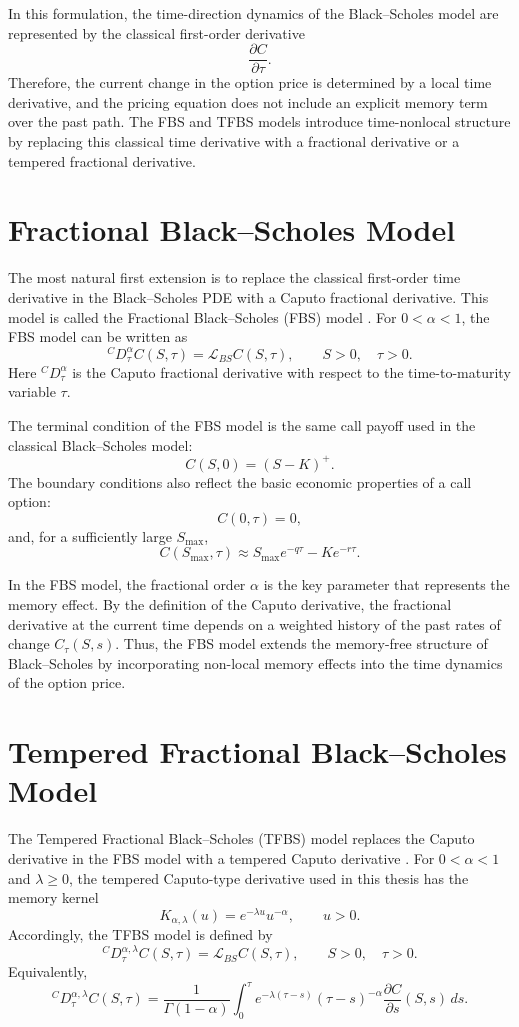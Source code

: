 \documentclass[11pt,a4paper]{report}
\begin{document}
In this formulation, the time-direction dynamics of the Black--Scholes model are represented by the classical first-order derivative
\[
\frac{\partial C}{\partial \tau}.
\]
Therefore, the current change in the option price is determined by a local time derivative, and the pricing equation does not include an explicit memory term over the past path. The FBS and TFBS models introduce time-nonlocal structure by replacing this classical time derivative with a fractional derivative or a tempered fractional derivative.

\section{Fractional Black--Scholes Model}

The most natural first extension is to replace the classical first-order time derivative in the Black--Scholes PDE with a Caputo fractional derivative. This model is called the Fractional Black--Scholes (FBS) model \cite{Wyss2000,Magdziarz2009}. For $0<\alpha<1$, the FBS model can be written as
\[
{}^C D_\tau^\alpha C(S,\tau)
=
\mathcal{L}_{BS}C(S,\tau),
\qquad S>0,
\quad \tau>0.
\]
Here ${}^C D_\tau^\alpha$ is the Caputo fractional derivative with respect to the time-to-maturity variable $\tau$.

The terminal condition of the FBS model is the same call payoff used in the classical Black--Scholes model:
\[
C(S,0)
=
(S-K)^+.
\]
The boundary conditions also reflect the basic economic properties of a call option:
\[
C(0,\tau)=0,
\]
and, for a sufficiently large $S_{\max}$,
\[
C(S_{\max},\tau)
\approx
S_{\max}e^{-q\tau}
-
Ke^{-r\tau}.
\]

In the FBS model, the fractional order $\alpha$ is the key parameter that represents the memory effect. By the definition of the Caputo derivative, the fractional derivative at the current time depends on a weighted history of the past rates of change $C_\tau(S,s)$. Thus, the FBS model extends the memory-free structure of Black--Scholes by incorporating non-local memory effects into the time dynamics of the option price.

\section{Tempered Fractional Black--Scholes Model}

The Tempered Fractional Black--Scholes (TFBS) model replaces the Caputo derivative in the FBS model with a tempered Caputo derivative \cite{SabzikarMeerschaertChen2015}. For $0<\alpha<1$ and $\lambda\ge0$, the tempered Caputo-type derivative used in this thesis has the memory kernel
\[
K_{\alpha,\lambda}(u)
=
e^{-\lambda u}u^{-\alpha},
\qquad u>0.
\]
Accordingly, the TFBS model is defined by
\[
{}^C D_\tau^{\alpha,\lambda} C(S,\tau)
=
\mathcal{L}_{BS}C(S,\tau),
\qquad S>0,
\quad \tau>0.
\]
Equivalently,
\[
{}^C D_\tau^{\alpha,\lambda} C(S,\tau)
=
\frac{1}{\Gamma(1-\alpha)}
\int_0^\tau
e^{-\lambda(\tau-s)}
(\tau-s)^{-\alpha}
\frac{\partial C}{\partial s}(S,s)\,ds.
\]
\end{document}
